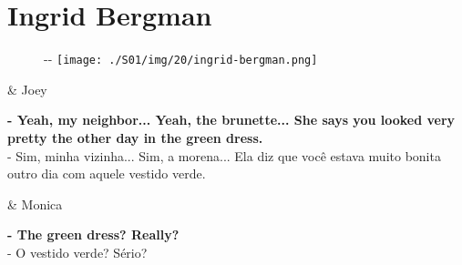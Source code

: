 \hypertarget{ingrid-bergman}{%
\section{Ingrid Bergman}\label{ingrid-bergman}}

\begin{figure}[!ht]
  \begin{adjustwidth}{-\oddsidemargin-1in}{-\rightmargin}
    \centering
    \texttt{[image: ./S01/img/20/ingrid-bergman.png]}
  \end{adjustwidth}
\end{figure}

\begin{tcolorbox}[enhanced,center upper,
    drop fuzzy shadow southeast, boxrule=0.3pt,
    lower separated=false, breakable,
    colframe=black!30!dialogoBorder,colback=white]
\begin{minipage}[c]{0.16\linewidth}
   & \centering \scriptsize{Joey}
\end{minipage}
\hfill
\begin{minipage}[c]{0.8\linewidth}
  \textbf{- Yeah, my neighbor... Yeah, the brunette... She says you looked very pretty the other day in the green dress.}\\
  - Sim, minha vizinha... Sim, a morena... Ela diz que você estava muito bonita outro dia com aquele vestido verde.
\end{minipage}

\medskip
\begin{minipage}[c]{0.16\linewidth}
   & \centering \scriptsize{Monica}
\end{minipage}
\hfill
\begin{minipage}[c]{0.8\linewidth}
  \textbf{- The green dress? Really?}\\
  - O vestido verde? Sério?
\end{minipage}


\end{tcolorbox}
